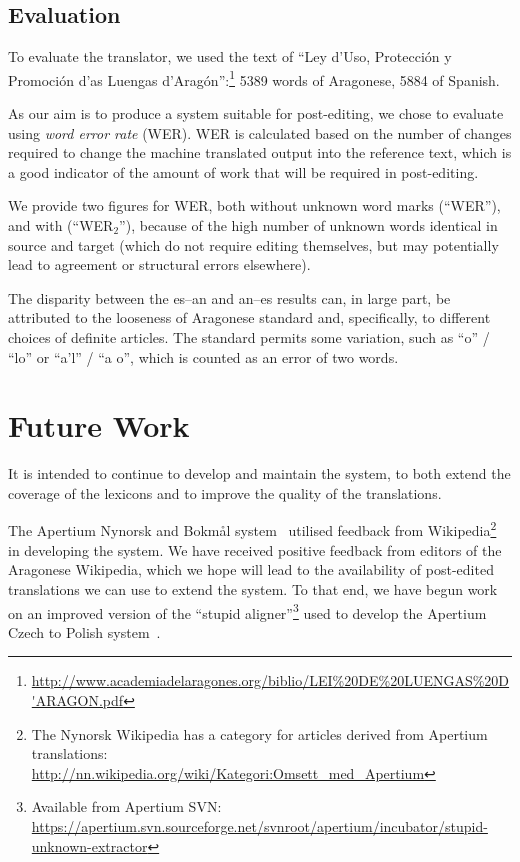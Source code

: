 \documentclass[10pt, a4paper]{article}
\begin{document}
  \subsection{Evaluation}
  
  To evaluate the translator, we used the text of ``Ley d'Uso, Protección y Promoción d'as Luengas d'Aragón'':\footnote{\url{http://www.academiadelaragones.org/biblio/LEI\%20DE\%20LUENGAS\%20D'ARAGON.pdf}} 5389 words of Aragonese, 5884 of Spanish.
  
  As our aim is to produce a system suitable for post-editing, we chose to evaluate using \emph{word error rate} (WER). WER is calculated based on the number of changes required to change the machine translated output into the reference text, which is a good indicator of the amount of work that will be required in post-editing.
  
  We provide two figures for WER, both without unknown word marks (``WER''), and with (``WER$_2$''), because of the high number of unknown words identical in source and target (which do not require editing themselves, but may potentially lead to agreement or structural errors elsewhere).
  
  The disparity between the es--an and an--es results can, in large part, be attributed to the looseness of Aragonese standard and, specifically, to different choices of definite articles. The standard permits some variation, such as ``o'' / ``lo''  or ``a'l'' / ``a o'', which is counted as an error of two words.
  
  \section{Future Work}
  
  It is intended to continue to develop and maintain the system, to both extend the coverage of the lexicons and to improve the quality of the translations.
  
  The Apertium Nynorsk and Bokmål system~\cite{Unhammer} utilised feedback from Wikipedia\footnote{The Nynorsk Wikipedia has a category for articles derived from Apertium translations: {\small \url{http://nn.wikipedia.org/wiki/Kategori:Omsett_med_Apertium}}} in developing the system. We have received positive feedback from editors of the Aragonese Wikipedia, which we hope will lead to the availability of post-edited translations we can use to extend the system. 
To that end, we have begun work on an improved version of the ``stupid aligner''\footnote{Available from Apertium SVN: \url{https://apertium.svn.sourceforge.net/svnroot/apertium/incubator/stupid-unknown-extractor}} used to develop the Apertium Czech to Polish system~\cite{Ruth}.
  
\end{document}
